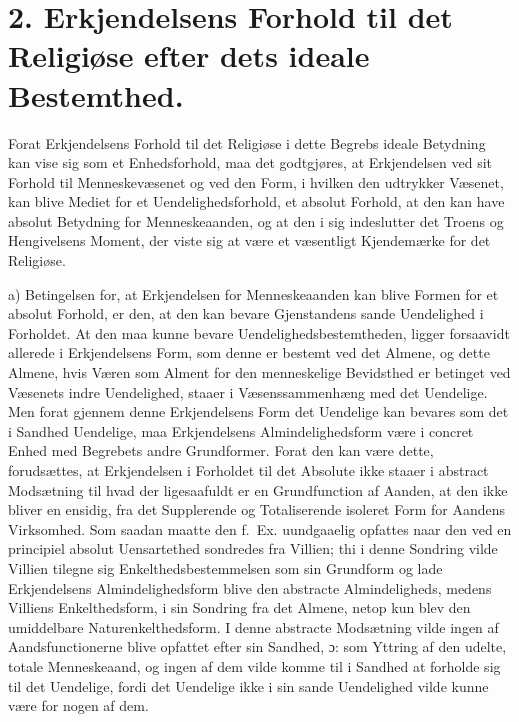 \section*{2. Erkjendelsens Forhold til det Religiøse efter dets ideale Bestemthed.}

Forat Erkjendelsens Forhold til det Religiøse i dette Begrebs ideale Betydning
kan vise sig som et Enhedsforhold, maa det godtgjøres, at Erkjendelsen ved sit
Forhold til Menneskevæsenet og ved den Form, i hvilken den udtrykker Væsenet,
kan blive Mediet for et Uendelighedsforhold, et absolut Forhold, at den kan
have absolut Betydning for Menneskeaanden, og at den i sig indeslutter det
Troens og
 Hengivelsens Moment, der viste sig at være et væsentligt Kjendemærke for det
Religiøse.

a) Betingelsen for, at Erkjendelsen for Menneskeaanden kan blive Formen for et
absolut Forhold, er den, at den kan bevare Gjenstandens sande Uendelighed i
Forholdet. At den maa kunne bevare Uendelighedsbestemtheden, ligger forsaavidt
allerede i Erkjendelsens Form, som denne er bestemt ved det Almene, og dette
Almene, hvis Væren som Alment for den menneskelige Bevidsthed er betinget ved
Væsenets indre Uendelighed, staaer i Væsenssammenhæng med det Uendelige. Men
forat gjennem denne Erkjendelsens Form det Uendelige kan bevares som det i
Sandhed Uendelige, maa Erkjendelsens Almindelighedsform være i concret Enhed
med Begrebets andre Grundformer. Forat den kan være dette, forudsættes, at
Erkjendelsen i Forholdet til det Absolute ikke staaer i abstract Modsætning til
hvad der ligesaafuldt er en Grundfunction af Aanden, at den ikke bliver en
ensidig, fra det Supplerende og Totaliserende isoleret Form for Aandens
Virksomhed. Som saadan maatte den f.\ Ex. uundgaaelig opfattes naar den ved en
principiel absolut Uensartethed sondredes fra Villien; thi i denne Sondring
vilde Villien tilegne sig Enkelthedsbestemmelsen som sin Grundform og lade
Erkjendelsens Almindelighedsform blive den abstracte Almindeligheds, medens
Villiens Enkelthedsform, i sin Sondring fra det Almene, netop kun blev den
umiddelbare Naturenkelthedsform. I denne abstracte Modsætning vilde ingen af
Aandsfunctionerne blive opfattet efter sin Sandhed, ɔ: som Yttring af den
udelte, totale Menneskeaand, og ingen af dem vilde komme til i Sandhed at
forholde sig til det Uendelige, fordi det Uendelige ikke i sin sande
Uendelighed vilde kunne være for nogen af dem.

